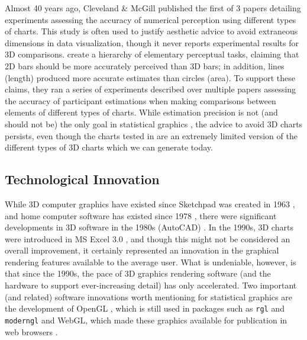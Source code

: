 \documentclass[runningheads
]{llncs}
\begin{document}
Almost 40 years ago, Cleveland \& McGill published the first of 3 papers
detailing experiments assessing the accuracy of numerical perception
using different types of charts. This study is often used to justify
aesthetic advice
\autocite{tufteVisualDisplayQuantitative2001,wainerHowDisplayData1984,kosslynGraphicsHumanInformation1985,kosslynGraphDesignEye2006,wainerPicturingUncertainWorld2009}
to avoid extraneous dimensions in data visualization, though it never
reports experimental results for 3D comparisons.
\textcite{clevelandGraphicalPerceptionTheory1984} create a hierarchy of
elementary perceptual tasks, claiming that 2D bars should be more
accurately perceived than 3D bars; in addition, lines (length) produced
more accurate estimates than circles (area). To support these claims,
they ran a series of experiments described over multiple papers
\autocite{clevelandGraphicalPerceptionTheory1984,clevelandGraphicalPerceptionGraphical1985,clevelandGraphicalPerceptionVisual1987}
assessing the accuracy of participant estimations when making
comparisons between elements of different types of charts. While
estimation precision is not (and should not be) the only goal in
statistical graphics \autocite{bertiniWhyShouldnAll2020}, the advice to
avoid 3D charts persists, even though the charts tested in
\textcite{clevelandGraphicalPerceptionTheory1984} are an extremely
limited version of the different types of 3D charts which we can
generate today.

\hypertarget{technological-innovation}{%
\subsection{Technological Innovation}\label{technological-innovation}}

While 3D computer graphics have existed since Sketchpad was created in
1963 \autocite{sutherlandSketchpadManmachineGraphical1963}, and home
computer software has existed since 1978
\autocite{miyazawa3DARTGRAPHICS1978}, there were significant
developments in 3D software in the 1980s (AutoCAD)
\autocite{walkerAutodeskFile2017}. In the 1990s, 3D charts were
introduced in MS Excel 3.0
\autocite{walkenbachVersionsExcelExplained2021}, and though this might
not be considered an overall improvement, it certainly represented an
innovation in the graphical rendering features available to the average
user. What is undeniable, however, is that since the 1990s, the pace of
3D graphics rendering software (and the hardware to support
ever-increasing detail) has only accelerated. Two important (and
related) software innovations worth mentioning for statistical graphics
are the development of OpenGL \autocite{buss3DComputerGraphics2003},
which is still used in packages such as \texttt{rgl} \autocite{rgl} and
\texttt{moderngl} \autocite{dombiModernGL2024} and WebGL, which made
these graphics available for publication in web browsers
\autocite{parisiWebGLRunning2012,deitsMeshcatdevMeshcatpython2024}.
\end{document}

